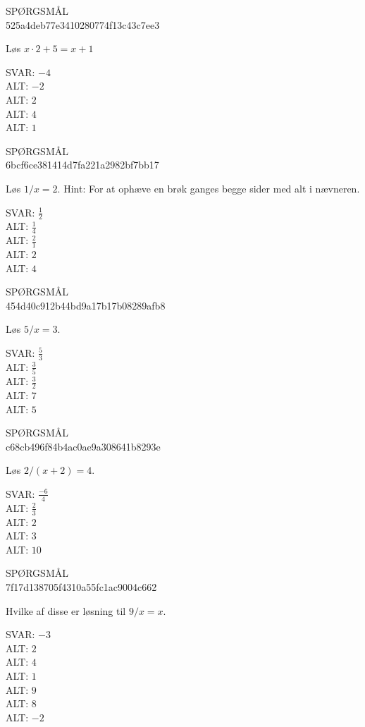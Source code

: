 \documentclass[]{article}
\newenvironment{question}[2]{SPØRGSMÅL\\}{\hspace{50px}}
\newcommand{\answer}[1]{{\color{green} SVAR: #1}\\}
\newcommand{\alt}[1]{{\color{red} ALT: #1}\\}
\begin{document}
\begin{question}{multi}\id{525a4deb77e3410280774f13c43c7ee3}
    
    Løs $x\cdot 2+5=x+1$
    
    \answer{$-4$}
    \alt{$-2$}
    \alt{$2$}
    \alt{$4$}
    \alt{$1$}
    
\end{question}

\begin{question}{multi}\id{6bcf6ce381414d7fa221a2982bf7bb17}
    
    Løs $1/x=2$. Hint: For at ophæve en brøk ganges begge sider med alt i nævneren.
    
    \answer{$\frac{1}{2}$}
    \alt{$\frac{1}{4}$}
    \alt{$\frac{2}{1}$}
    \alt{$2$}
    \alt{$4$}
    
\end{question}

\begin{question}{multi}\id{454d40c912b44bd9a17b17b08289afb8}
    
    Løs $5/x=3$.
    
    \answer{$\frac{5}{3}$}
    \alt{$\frac{3}{5}$}
    \alt{$\frac{3}{2}$}
    \alt{$7$}
    \alt{$5$}
    
\end{question}

\begin{question}{multi}\id{c68cb496f84b4ac0ae9a308641b8293e}
    
    Løs $2/(x+2)=4$.
    
    \answer{$\frac{-6}{4}$}
    \alt{$\frac{2}{3}$}
    \alt{$2$}
    \alt{$3$}
    \alt{$10$}
    
\end{question}

\begin{question}{multi}\id{7f17d138705f4310a55fc1ac9004c662}
    
    Hvilke af disse er løsning til $9/x=x$.
    
    \answer{$-3$}
    \alt{$2$}
    \alt{$4$}
    \alt{$1$}
    \alt{$9$}
    \alt{$8$}
    \alt{$-2$}
    
\end{question}
\end{document}
